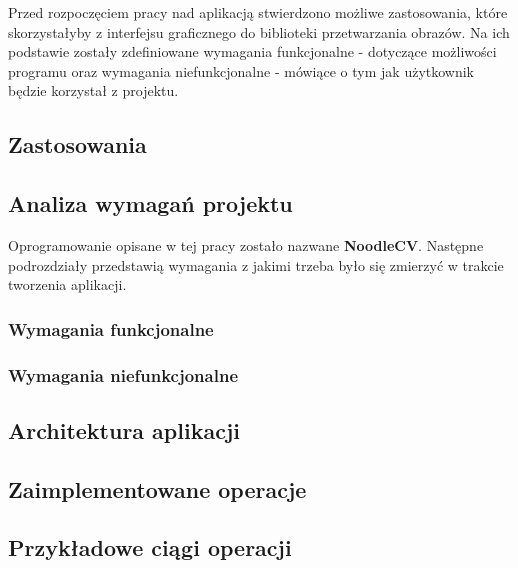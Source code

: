 
Przed rozpoczęciem pracy nad aplikacją stwierdzono możliwe zastosowania, które skorzystałyby z interfejsu graficznego do biblioteki przetwarzania obrazów.
Na ich podstawie zostały zdefiniowane wymagania funkcjonalne - dotyczące możliwości programu oraz wymagania niefunkcjonalne - mówiące o tym jak użytkownik będzie korzystał z projektu.

\subsection{Zastosowania}



\subsection{Analiza wymagań projektu}
Oprogramowanie opisane w tej pracy zostało nazwane \textbf{NoodleCV}. 
Następne podrozdziały przedstawią wymagania z jakimi trzeba było się zmierzyć w trakcie tworzenia aplikacji.

\subsubsection{Wymagania funkcjonalne}


\subsubsection{Wymagania niefunkcjonalne}


\subsection{Architektura aplikacji}



\subsection{Zaimplementowane operacje}



\subsection{Przykładowe ciągi operacji}


